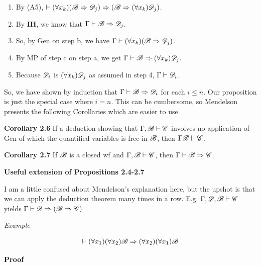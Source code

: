 \begin{enumerate}
\begin{enumerate} [label = \alph*.]
            \item By (A5), $\vdash (\forall x_k)(\mathscr{B} \Rightarrow \mathscr{D}_j) \Rightarrow (\mathscr{B} \Rightarrow (\forall x_k) \mathscr{D}_j)$.
            \item By \textbf{IH}, we know that $\Gamma \vdash \mathscr{B} \Rightarrow \mathscr{D}_j$.
            \item So, by Gen on step b, we have $\Gamma\vdash (\forall x_k)(\mathscr{B} \Rightarrow \mathscr{D}_j)$.
            \item By MP of step c on step a, we get $\Gamma \vdash \mathscr{B} \Rightarrow (\forall x_k) \mathscr{D}_j$.
            \item Because $\mathscr{D}_i$ is $(\forall x_k)\mathscr{D}_j$ as assumed in step 4, $\Gamma \vdash \mathscr{D}_i$.
        \end{enumerate}
\end{enumerate}

So, we have shown by induction that $\Gamma \vdash \mathscr{B} \Rightarrow \mathscr{D}_i$ for each $i \leq n$. Our proposition is just the special case where $i=n$. This can be cumbersome, so Mendelson presents the following Corollaries which are easier to use. 

\textbf{Corollary 2.6}
If a deduction showing that $\Gamma, \mathscr{B} \vdash \mathscr{C}$ involves no application of Gen of which the quantified variables is free in $\mathscr{B}$, then $\Gamma \mathscr{B} \vdash \mathscr{C}$. 

\textbf{Corollary 2.7}
If $\mathscr{B}$ is a closed wf and $\Gamma, \mathscr{B} \vdash \mathscr{C}$, then $\Gamma \vdash \mathscr{B} \Rightarrow \mathscr{C}$.

\textbf{Useful extension of Propositions 2.4-2.7}

I am a little confused about Mendelson's explanation here, but the upshot is that we can apply the deduction theorem many times in a row.  E.g. $\Gamma, \mathscr{D}, \mathscr{B} \vdash \mathscr{C}$ yields $\Gamma \vdash \mathscr{D} \Rightarrow (\mathscr{B} \Rightarrow \mathscr{C})$

\textit{Example}

\[\vdash (\forall x_1)(\forall x_2) \mathscr{B} \Rightarrow (\forall x_2)(\forall x_1) \mathscr{B}\] 

\textbf{Proof}

